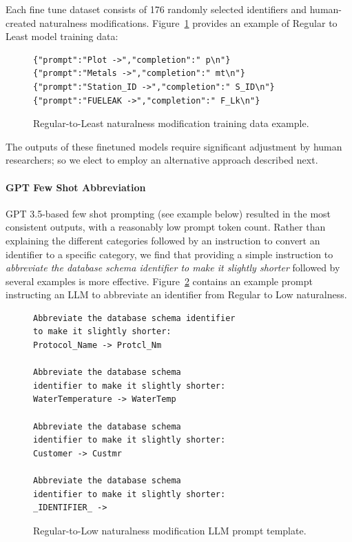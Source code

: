 Each fine tune dataset consists of 176 randomly selected identifiers and human-created naturalness modifications.
Figure~\ref{fig:regtoleasttrainingdata} provides an example of Regular to Least model training data:

\begin{figure}
\begin{Verbatim}[frame=single,fillcolor=\color{lightgray}]
{"prompt":"Plot ->","completion":" p\n"}
{"prompt":"Metals ->","completion":" mt\n"}
{"prompt":"Station_ID ->","completion":" S_ID\n"}
{"prompt":"FUELEAK ->","completion":" F_Lk\n"}
\end{Verbatim} 
\caption{Regular-to-Least naturalness modification training data example.}
\label{fig:regtoleasttrainingdata}
\end{figure}

The outputs of these finetuned models require significant adjustment by human researchers; so we elect to employ an alternative approach described next.

\paragraph{\textbf{GPT Few Shot Abbreviation}}

GPT 3.5-based few shot prompting (see example below) resulted in the most consistent outputs, with a reasonably low prompt token count.
Rather than explaining the different categories followed by an instruction to convert an identifier to a specific category, we find that providing a simple instruction to \emph{abbreviate the database schema identifier to make it slightly shorter} followed by several examples is more effective.
Figure~\ref{fig:regtolowprompt} contains an example prompt instructing an LLM to abbreviate an identifier from Regular to Low naturalness.

\begin{figure}
\begin{Verbatim}[frame=single,fillcolor=\color{lightgray}]
Abbreviate the database schema identifier 
to make it slightly shorter:
Protocol_Name -> Protcl_Nm

Abbreviate the database schema 
identifier to make it slightly shorter:
WaterTemperature -> WaterTemp

Abbreviate the database schema
identifier to make it slightly shorter:
Customer -> Custmr

Abbreviate the database schema 
identifier to make it slightly shorter:
_IDENTIFIER_ ->
\end{Verbatim}
\caption{Regular-to-Low naturalness modification LLM prompt template.}
\label{fig:regtolowprompt}
\end{figure}

